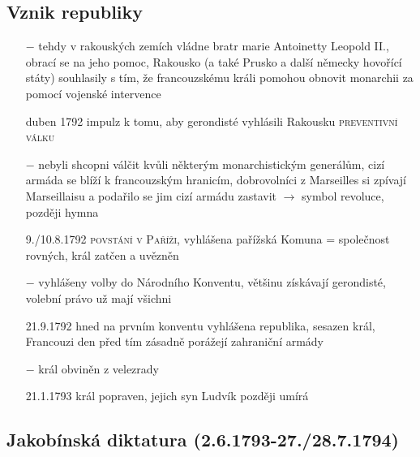 \documentclass{article}
\begin{document}
\subsection*{Vznik republiky}
\begin{itemize}
    \vspace{-0.5em}
    \setlength\itemsep{0.15em}
    \item[$-$] tehdy v rakouských zemích vládne bratr marie Antoinetty Leopold II., obrací se na jeho pomoc, Rakousko (a také Prusko a další německy hovořící státy) souhlasily s tím, že francouzskému králi pomohou obnovit monarchii za pomocí vojenské intervence
    \item[duben 1792] impulz k tomu, aby gerondisté vyhlásili Rakousku \textsc{preventivní válku}
    \item[$-$] nebyli shcopni válčit kvůli některým monarchistickým generálům, cizí armáda se blíží k francouzským hranicím, dobrovolníci z Marseilles si zpívají Marseillaisu a podařilo se jim cizí armádu zastavit $\rightarrow$ symbol revoluce, později hymna
    \item[9./10.8.1792] \textsc{povstání v Paříži}, vyhlášena pařížská Komuna = společnost rovných, král zatčen a uvězněn
    \item[$-$] vyhlášeny volby do Národního Konventu, většinu získávají gerondisté, volební právo už mají všichni
    \item[21.9.1792] hned na prvním konventu vyhlášena republika, sesazen král, Francouzi den před tím zásadně porážejí zahraniční armády
    \item[$-$] král obviněn z velezrady
    \item[21.1.1793] král popraven, jejich syn Ludvík později umírá
\end{itemize}
\subsection*{Jakobínská diktatura (2.6.1793-27./28.7.1794)}
\end{document}
